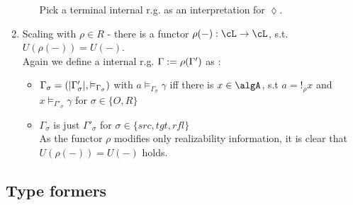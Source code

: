 \documentclass[12pt,a4paper]{article}
\def\rfl{_{refl}}\alwaysmath{rfl}
\renewcommand{\O}{_{O}}\alwaysmath{O}
\def\R{_{R}}\alwaysmath{R}
\begin{document}
\begin{enumerate}[noitemsep]
\begin{itemize}[noitemsep]
    Pick a terminal internal r.g. as an interpretation for $\lozenge$.
  \end{itemize}  
  \item Scaling with $\rho \in R$ - there is a functor $\rho(-) : \cL \to \cL$, s.t. $U(\rho(-)) = U(-)$.\\
  Again we define a internal r.g. $\Gamma := \rho(\Gamma')$ as :
  \begin{itemize}
    \item $\Gamma_\sigma = (|\Gamma'_\sigma|, \vDash_{\Gamma_\sigma})$ with $a \vDash_{\Gamma_\sigma} \gamma$ iff there is $x \in \algA$, s.t $a = !_\rho x$ and $x \vDash_{\Gamma'_\sigma} \gamma$ for $\sigma \in \{O, R\}$
    
    \item $\Gamma_\sigma$ is just $\Gamma'_\sigma$ for $\sigma\in\{src,tgt,rfl\}$ \\
    
    As the functor $\rho$ modifies only realizability information, it is clear that $U(\rho(-)) = U(-)$ holds.
    
  \end{itemize}
  
\end{enumerate}

\subsection*{Type formers}

\end{document}
